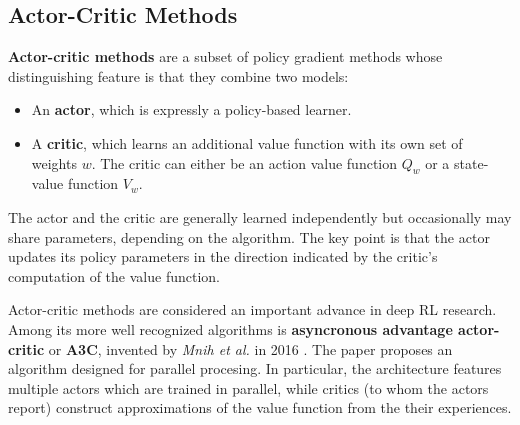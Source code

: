 
\subsection{Actor-Critic Methods} \label{section:actor-critic}
\textbf{Actor-critic methods} are a subset of policy gradient methods whose distinguishing feature is that they combine two models:
\begin{itemize}
    \item An \textbf{actor}, which is expressly a policy-based learner.
    \item A \textbf{critic}, which learns an additional value function with its own set of weights $w$. The critic can either be an action value function $Q_{w}$ or a state-value function $V_{w}$.
\end{itemize}

The actor and the critic are generally learned independently but occasionally may share parameters, depending on the algorithm.
The key point is that the actor updates its policy parameters in the direction indicated by the critic’s computation of the value function.


Actor-critic methods are considered an important advance in deep RL research.
Among its more well recognized algorithms is \textbf{asyncronous advantage actor-critic} or \textbf{A3C}, invented by \emph{Mnih et al.} in 2016 \cite{a3c-paper}.
The paper proposes an algorithm designed for parallel procesing.
In particular, the architecture features multiple actors which are trained in parallel, while critics (to whom the actors report) construct approximations of the value function from the their experiences.